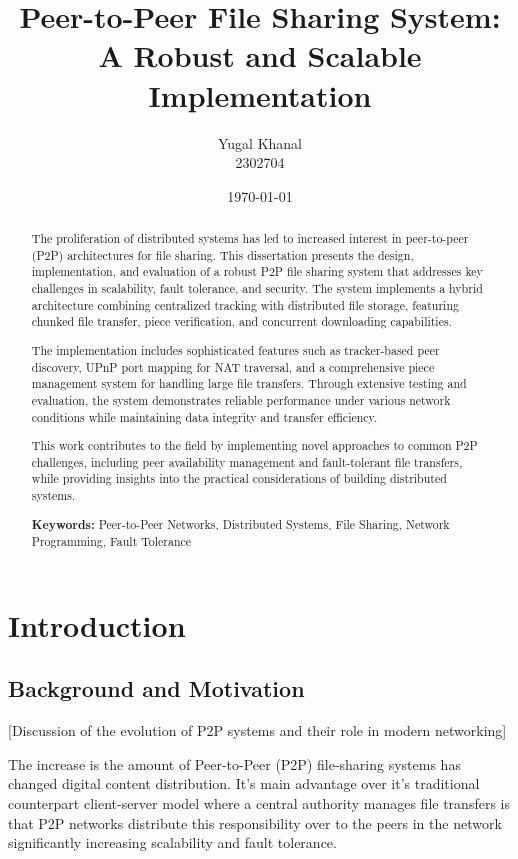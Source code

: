 \documentclass[12pt,a4paper]{report}
\title{Peer-to-Peer File Sharing System:\\A Robust and Scalable Implementation}
\author{Yugal Khanal\\2302704}
\date{\today}
\begin{document}
\maketitle

\begin{abstract}
	The proliferation of distributed systems has led to increased interest in peer-to-peer (P2P) architectures for file sharing. This dissertation presents the design, implementation, and evaluation of a robust P2P file sharing system that addresses key challenges in scalability, fault tolerance, and security. The system implements a hybrid architecture combining centralized tracking with distributed file storage, featuring chunked file transfer, piece verification, and concurrent downloading capabilities.

	The implementation includes sophisticated features such as tracker-based peer discovery, UPnP port mapping for NAT traversal, and a comprehensive piece management system for handling large file transfers. Through extensive testing and evaluation, the system demonstrates reliable performance under various network conditions while maintaining data integrity and transfer efficiency.

	This work contributes to the field by implementing novel approaches to common P2P challenges, including peer availability management and fault-tolerant file transfers, while providing insights into the practical considerations of building distributed systems.

	\textbf{Keywords:} Peer-to-Peer Networks, Distributed Systems, File Sharing, Network Programming, Fault Tolerance
\end{abstract}

\tableofcontents
\listoffigures
\listoftables

\chapter{Introduction}
\section{Background and Motivation}
 [Discussion of the evolution of P2P systems and their role in modern networking]

The increase is the amount of Peer-to-Peer (P2P) file-sharing systems has changed digital content distribution. It's main advantage over it's traditional counterpart client-server model where a central authority manages file transfers is that P2P networks distribute this responsibility over to the peers in the network significantly increasing scalability and fault tolerance.
\end{document}
